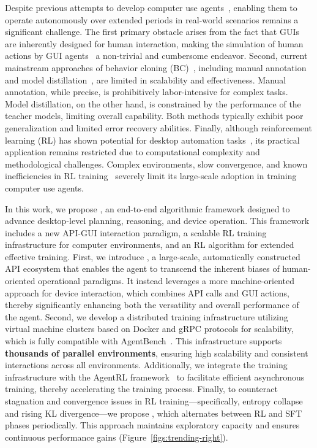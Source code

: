 Despite previous attempts to develop computer use agents~\citep{agashe2025agent, lei2024infant, xie2025scaling}, enabling them to operate autonomously over extended periods in real-world scenarios remains a significant challenge. The first primary obstacle arises from the fact that GUIs are inherently designed for human interaction, making the simulation of human actions by GUI agents~\citep{liu2024autoglm,cua2025,qin2025ui} a non-trivial and cumbersome endeavor. 
Second, current mainstream approaches of behavior cloning (BC)~\citep{bain1995framework, bratko1995behavioural}, including manual annotation~\citep{he2025efficient} and model distillation~\citep{sun2024genesis,xu2024aguvis}, are limited in scalability and effectiveness. Manual annotation, while precise, is prohibitively labor-intensive for complex tasks. Model distillation, on the other hand, is constrained by the performance of the teacher models, limiting overall capability. Both methods typically exhibit poor generalization and limited error recovery abilities.
Finally, although reinforcement learning (RL) has shown potential for desktop automation tasks~\citep{lu2025arpo, feng2025group}, its practical application remains restricted due to computational complexity and methodological challenges. Complex environments, slow convergence, and known inefficiencies in RL training~\citep{xie2024osworld, bonatti2024windows, yu2025dapo, fu2025areal} severely limit its large-scale adoption in training computer use agents.

In this work, we propose \computerrl, an end-to-end algorithmic framework designed to advance desktop-level planning, reasoning, and device operation. This framework includes a new API-GUI interaction paradigm, a scalable RL training infrastructure for computer environments, and an RL algorithm for extended effective training.
First, we introduce \actionmethod, a large-scale, automatically constructed API ecosystem that enables the agent to transcend the inherent biases of human-oriented operational paradigms.
It instead leverages a more machine-oriented approach for device interaction, which combines API calls and GUI actions, thereby significantly enhancing both the versatility and overall performance of the agent.
Second, we develop a distributed training infrastructure utilizing virtual machine clusters based on Docker and gRPC protocols for scalability, which is fully compatible with AgentBench~\citep{liu2023agentbench}. This infrastructure supports \textbf{thousands of parallel environments}, ensuring high scalability and consistent interactions across all environments. Additionally, we integrate the training infrastructure with the AgentRL framework~\citep{zhang2025model} to facilitate efficient asynchronous training, thereby accelerating the training process.
Finally, to counteract stagnation and convergence issues in RL training—specifically, entropy collapse and rising KL divergence—we propose \rlmethod, which alternates between RL and SFT phases periodically. This approach maintains exploratory capacity and ensures continuous performance gains (Figure~\ref{figs:trending-right}). 

